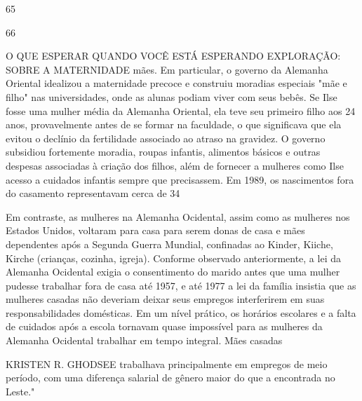  \par 
65
 \par 
66
 \par 
O QUE ESPERAR QUANDO VOCÊ ESTÁ ESPERANDO EXPLORAÇÃO: SOBRE A MATERNIDADE mães. Em particular, o governo da Alemanha Oriental idealizou a maternidade precoce e construiu moradias especiais "mãe e filho" nas universidades, onde as alunas podiam viver com seus bebês. Se Ilse fosse uma mulher média da Alemanha Oriental, ela teve seu primeiro filho aos {\color{blue}24} anos, provavelmente antes de se formar na faculdade, o que significava que ela evitou o declínio da fertilidade associado ao atraso na gravidez. O governo subsidiou fortemente moradia, roupas infantis, alimentos básicos e outras despesas associadas à criação dos filhos, além de fornecer a mulheres como Ilse acesso a cuidados infantis sempre que precisassem. Em 1989, os nascimentos fora do casamento representavam cerca de 34%
 \par 
Em contraste, as mulheres na Alemanha Ocidental, assim como as mulheres nos Estados Unidos, voltaram para casa para serem donas de casa e mães dependentes após a Segunda Guerra Mundial, confinadas ao Kinder, Kiiche, Kirche (crianças, cozinha, igreja). Conforme observado anteriormente, a lei da Alemanha Ocidental exigia o consentimento do marido antes que uma mulher pudesse trabalhar fora de casa até 1957, e até 1977 a lei da família insistia que as mulheres casadas não deveriam deixar seus empregos interferirem em suas responsabilidades domésticas. Em um nível prático, os horários escolares e a falta de cuidados após a escola tornavam quase impossível para as mulheres da Alemanha Ocidental trabalhar em tempo integral. Mães casadas
 \par 
KRISTEN R. GHODSEE trabalhava principalmente em empregos de meio período, com uma diferença salarial de gênero maior do que a encontrada no Leste."
 \par 

